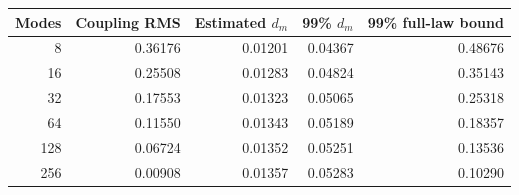 \begin{tabular}{rrrrr}
\toprule
Modes & Coupling RMS & Estimated $d_m$ & 99\% $d_m$ & 99\% full-law bound \\
\midrule
8 & 0.36176 & 0.01201 & 0.04367 & 0.48676 \\
16 & 0.25508 & 0.01283 & 0.04824 & 0.35143 \\
32 & 0.17553 & 0.01323 & 0.05065 & 0.25318 \\
64 & 0.11550 & 0.01343 & 0.05189 & 0.18357 \\
128 & 0.06724 & 0.01352 & 0.05251 & 0.13536 \\
256 & 0.00908 & 0.01357 & 0.05283 & 0.10290 \\
\bottomrule
\end{tabular}
